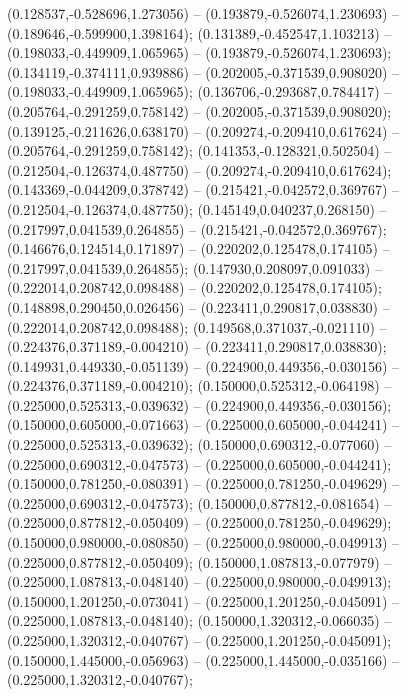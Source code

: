  (0.128537,-0.528696,1.273056) -- (0.193879,-0.526074,1.230693) -- (0.189646,-0.599900,1.398164);
 (0.131389,-0.452547,1.103213) -- (0.198033,-0.449909,1.065965) -- (0.193879,-0.526074,1.230693);
 (0.134119,-0.374111,0.939886) -- (0.202005,-0.371539,0.908020) -- (0.198033,-0.449909,1.065965);
 (0.136706,-0.293687,0.784417) -- (0.205764,-0.291259,0.758142) -- (0.202005,-0.371539,0.908020);
 (0.139125,-0.211626,0.638170) -- (0.209274,-0.209410,0.617624) -- (0.205764,-0.291259,0.758142);
 (0.141353,-0.128321,0.502504) -- (0.212504,-0.126374,0.487750) -- (0.209274,-0.209410,0.617624);
 (0.143369,-0.044209,0.378742) -- (0.215421,-0.042572,0.369767) -- (0.212504,-0.126374,0.487750);
 (0.145149,0.040237,0.268150) -- (0.217997,0.041539,0.264855) -- (0.215421,-0.042572,0.369767);
 (0.146676,0.124514,0.171897) -- (0.220202,0.125478,0.174105) -- (0.217997,0.041539,0.264855);
 (0.147930,0.208097,0.091033) -- (0.222014,0.208742,0.098488) -- (0.220202,0.125478,0.174105);
 (0.148898,0.290450,0.026456) -- (0.223411,0.290817,0.038830) -- (0.222014,0.208742,0.098488);
 (0.149568,0.371037,-0.021110) -- (0.224376,0.371189,-0.004210) -- (0.223411,0.290817,0.038830);
 (0.149931,0.449330,-0.051139) -- (0.224900,0.449356,-0.030156) -- (0.224376,0.371189,-0.004210);
 (0.150000,0.525312,-0.064198) -- (0.225000,0.525313,-0.039632) -- (0.224900,0.449356,-0.030156);
 (0.150000,0.605000,-0.071663) -- (0.225000,0.605000,-0.044241) -- (0.225000,0.525313,-0.039632);
 (0.150000,0.690312,-0.077060) -- (0.225000,0.690312,-0.047573) -- (0.225000,0.605000,-0.044241);
 (0.150000,0.781250,-0.080391) -- (0.225000,0.781250,-0.049629) -- (0.225000,0.690312,-0.047573);
 (0.150000,0.877812,-0.081654) -- (0.225000,0.877812,-0.050409) -- (0.225000,0.781250,-0.049629);
 (0.150000,0.980000,-0.080850) -- (0.225000,0.980000,-0.049913) -- (0.225000,0.877812,-0.050409);
 (0.150000,1.087813,-0.077979) -- (0.225000,1.087813,-0.048140) -- (0.225000,0.980000,-0.049913);
 (0.150000,1.201250,-0.073041) -- (0.225000,1.201250,-0.045091) -- (0.225000,1.087813,-0.048140);
 (0.150000,1.320312,-0.066035) -- (0.225000,1.320312,-0.040767) -- (0.225000,1.201250,-0.045091);
 (0.150000,1.445000,-0.056963) -- (0.225000,1.445000,-0.035166) -- (0.225000,1.320312,-0.040767);
